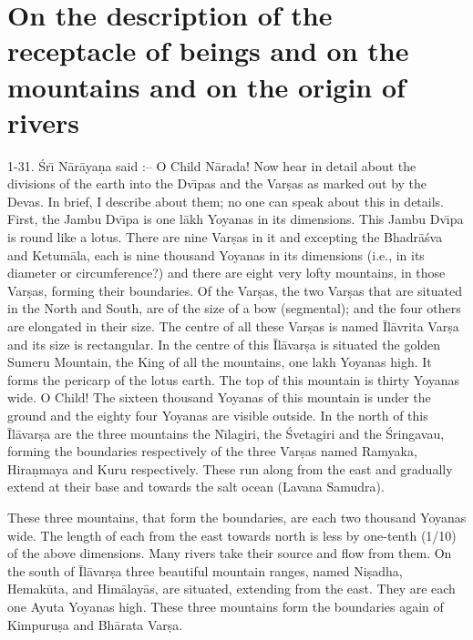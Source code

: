 \chapter{On the description of the receptacle of beings and on the mountains and on the origin of rivers}

1-31. \'Sr\={\i} N\=ar\=aya\d{n}a said :-- O Child N\=arada! Now hear in detail about the divisions of the earth into the Dv\={\i}pas and the Var\d{s}as as marked out by the Devas. In brief, I describe about them; no one can speak about this in details. First, the Jambu Dv\={\i}pa is one l\=akh Yoyanas in its dimensions. This Jambu Dv\={\i}pa is round like a lotus. There are nine Var\d{s}as in it and excepting the Bhadr\=a\'sva and Ketum\=ala, each is nine thousand Yoyanas in its dimensions (i.e., in its diameter or circumference?) and there are eight very lofty mountains, in those Var\d{s}as, forming their boundaries. Of the Var\d{s}as, the two Var\d{s}as that are situated in the North and South, are of the size of a bow (segmental); and the four others are elongated in their size. The centre of all these Var\d{s}as is named \=Il\=avrita Var\d{s}a and its size is rectangular. In the centre of this \=Il\=avar\d{s}a is situated the golden Sumeru Mountain, the King of all the mountains, one lakh Yoyanas high. It forms the pericarp of the lotus earth. The top of this mountain is thirty Yoyanas wide. O Child! The sixteen thousand Yoyanas of this mountain is under the ground and the eighty four Yoyanas are visible outside. In the north of this \=Il\=avar\d{s}a are the three mountains the N\={\i}lagiri, the \'Svetagiri and the \'Sringavau, forming the boundaries respectively of the three Var\d{s}as named Ramyaka, Hira\d{n}maya and Kuru respectively. These run along from the east and gradually extend at their base and towards the salt ocean (Lavana Samudra).

These three mountains, that form the boundaries, are each two thousand Yoyanas wide. The length of each from the east towards north is less by one-tenth (1/10) of the above dimensions. Many rivers take their source and flow from them. On the south of \=Il\=avar\d{s}a three beautiful mountain ranges, named Ni\d{s}adha, Hemak\=uta, and Him\=alay\=as, are situated, extending from the east. They are each one Ayuta Yoyanas high. These three mountains form the boundaries again of Kimpuru\d{s}a and Bh\=arata Var\d{s}a.

